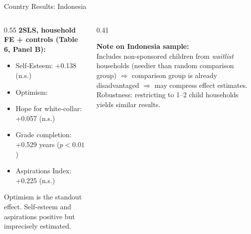 \documentclass[aspectratio=169, 10pt]{beamer}
\begin{document}
\begin{frame}{Country Results: Indonesia}
  \begin{columns}
    \begin{column}{0.55\textwidth}
      \textbf{2SLS, household FE + controls (Table 6, Panel B):}
      \begin{itemize}
        \item Self-Esteem: +0.138 (n.s.)
        \item Optimism: 
        \item Hope for white-collar: +0.057 (n.s.)
        \item Grade completion: +0.529 years ($p < 0.01$)
        \item Aspirations Index: +0.225 (n.s.)
      \end{itemize}
      \vspace{0.4em}
      Optimism is the standout effect. Self-esteem and aspirations positive but imprecisely estimated.
    \end{column}
    \begin{column}{0.41\textwidth}
      \begin{methodbox}
        \textbf{Note on Indonesia sample:}\\[0.3em]
        Includes non-sponsored children from \emph{waitlist} households (needier than random comparison group) $\Rightarrow$ comparison group is already disadvantaged $\Rightarrow$ may compress effect estimates.\\[0.3em]
        Robustness: restricting to 1--2 child households yields similar results.
      \end{methodbox}
    \end{column}
  \end{columns}
\end{frame}
\end{document}
